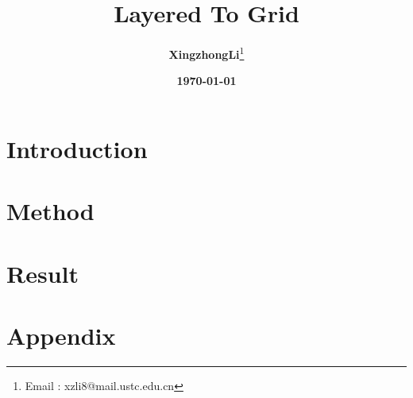 \documentclass[12pt, a4paper]{article}
\title{\textbf{\Huge Layered To Grid}}
\author{\textbf{XingzhongLi}\thanks{Email : xzli8@mail.ustc.edu.cn}}
\date{\textbf{\today}}
\begin{document}
\maketitle

\newpage
\tableofcontents

\newpage
\section{Introduction}


\newpage
\section{Method}


\section{Result}


\newpage
\section{Appendix}

\end{document}
